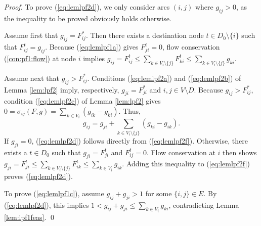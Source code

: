 \begin{proof}
To prove (\ref{eq:lemlpf2d}), we only consider arcs $(i,j)$ where $g_{ij}>0$, as the inequality to be proved obviously holds otherwise.

Assume first that $g_{ij}=F_{ij}^*$.
Then there exists a destination node $t\in D_0\setminus\{i\}$ such that $F_{ij}^t=g_{ij}$.
Because (\ref{eq:lemlpf1a}) gives $F_{ji}^t=0$, flow conservation (\ref{con:pf1:flow}) at node $i$ implies 
$g_{ij}=F_{ij}^t\leq \sum_{k\in V_i\setminus\{j\}}F_{ki}^t\leq \sum_{k\in V_i\setminus\{j\}}g_{ki}$.

Assume next that $g_{ij}>F_{ij}^*$.
Conditions (\ref{eq:lemlpf2a}) and (\ref{eq:lemlpf2b}) of Lemma \ref{lem:lpf2} imply, respectively,
$g_{ji}=F_{ji}^*$ and $i,j\in V\setminus D$.
Because $g_{ij}>F_{ij}^*$, 
condition (\ref{eq:lemlpf2c}) of Lemma \ref{lem:lpf2} gives
$0=\sigma_{ij}(F,g) = \sum_{k\in V_{i}}\left(g_{ik}-g_{ki}\right)$. Thus,
\begin{equation}
  g_{ij} = g_{ji} + \sum_{k\in V_{i}\setminus\{j\}}\left(g_{ki}-g_{ik}\right). \label{eq:lemlpf2f}
\end{equation}
If $g_{ji}=0$, (\ref{eq:lemlpf2d}) follows directly from (\ref{eq:lemlpf2f}).
Otherwise, there exists a $t\in D_0$ such that $g_{ji}=F_{ji}^t$ and $F_{ij}^t=0$.
Flow conservation at $i$ then shows $g_{ji}=F_{ji}^t\leq\sum_{k\in V_{i}\setminus\{j\}}F_{ik}^t\leq\sum_{k\in V_{i}}g_{ik}$.
Adding this inequality to (\ref{eq:lemlpf2f}) proves (\ref{eq:lemlpf2d}).

To prove (\ref{eq:lemlpf1c}), assume $g_{ij}+g_{ji}>1$ for some $\{i,j\}\in E$.
By (\ref{eq:lemlpf2d}), this implies $1<g_{ij}+g_{ji}\leq\sum_{k\in V_{i}}g_{ki}$, contradicting Lemma \ref{lem:lpf1feas}.
\qed\end{proof}

